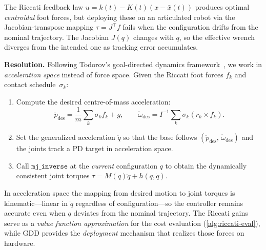 \begin{remark}
\label{rem:gdd}
The Riccati feedback law $u = k(t) - K(t)(x - \bar{x}(t))$ produces optimal \emph{centroidal} foot forces, but deploying these on an articulated robot via the Jacobian-transpose mapping $\tau = J^\top f$ fails when the configuration drifts from the nominal trajectory.  The Jacobian $J(q)$ changes with $q$, so the effective wrench diverges from the intended one as tracking error accumulates.

\medskip\noindent\textbf{Resolution.}
Following Todorov's goal-directed dynamics framework~\cite{TodorovGDD,TodorovDSO}, we work in \emph{acceleration space} instead of force space.
Given the Riccati foot forces $f_k$ and contact schedule~$\sigma_k$:
\begin{enumerate}[label=(\roman*)]
\item Compute the desired centre-of-mass acceleration:
\[
\ddot{p}_{\mathrm{des}} = \frac{1}{m}\sum_k \sigma_k f_k + g, \qquad
\dot{\omega}_{\mathrm{des}} = I^{-1}\sum_k \sigma_k (r_k \times f_k).
\]
\item Set the generalized acceleration $\ddot{q}$ so that the base follows $(\ddot{p}_{\mathrm{des}},\, \dot{\omega}_{\mathrm{des}})$ and the joints track a PD target in acceleration space.
\item Call $\texttt{mj\_inverse}$ at the \emph{current} configuration $q$ to obtain the dynamically consistent joint torques $\tau = M(q)\ddot{q} + h(q,\dot{q})$.
\end{enumerate}
In acceleration space the mapping from desired motion to joint torques is kinematic---linear in $\ddot{q}$ regardless of configuration---so the controller remains accurate even when $q$ deviates from the nominal trajectory.
The Riccati gains serve as a \emph{value function approximation} for the cost evaluation (\cref{alg:riccati-eval}), while GDD provides the \emph{deployment} mechanism that realizes those forces on hardware.
\end{remark}

